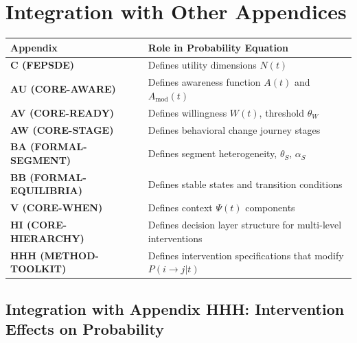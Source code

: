\documentclass[11pt, a4paper]{article}
\begin{document}

\section{Integration with Other Appendices}

\begin{center}
\begin{tabular}{|l|p{5cm}|}
\hline
\textbf{Appendix} & \textbf{Role in Probability Equation} \\
\hline
\textbf{C (FEPSDE)} & Defines utility dimensions $N(t)$ \\
\hline
\textbf{AU (CORE-AWARE)} & Defines awareness function $A(t)$ and $A_{\text{mod}}(t)$ \\
\hline
\textbf{AV (CORE-READY)} & Defines willingness $W(t)$, threshold $\theta_W$ \\
\hline
\textbf{AW (CORE-STAGE)} & Defines behavioral change journey stages \\
\hline
\textbf{BA (FORMAL-SEGMENT)} & Defines segment heterogeneity, $\theta_S$, $\alpha_S$ \\
\hline
\textbf{BB (FORMAL-EQUILIBRIA)} & Defines stable states and transition conditions \\
\hline
\textbf{V (CORE-WHEN)} & Defines context $\Psi(t)$ components \\
\hline
\textbf{HI (CORE-HIERARCHY)} & Defines decision layer structure for multi-level interventions \\
\hline
\textbf{HHH (METHOD-TOOLKIT)} & Defines intervention specifications that modify $P(i \to j | t)$ \\
\hline
\end{tabular}
\end{center}

\subsection{Integration with Appendix HHH: Intervention Effects on Probability}
\label{sec:bc-hhh-integration}
\end{document}
